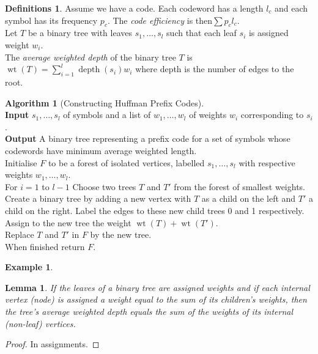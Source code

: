\documentclass{article}
\newtheorem*{lem}{Lemma}
\theoremstyle{definition}
\newtheorem*{defns}{Definitions}
\newtheorem*{ex}{Example}
\newtheorem*{alg}{Algorithm}
\DeclareMathOperator{\wt}{wt}
\DeclareMathOperator{\depth}{depth}
\begin{document}

\begin{defns}
Assume we have a code.
Each codeword has a length $l_c$ and each symbol has its frequency $p_c$.
The \emph{code efficiency} is then$\sum p_cl_c$. \\
Let $T$ be a binary tree with leaves $s_1,\ldots,s_l$ such that each leaf $s_i$ is assigned weight $w_i$.\\
The \emph{average weighted depth} of the binary tree $T$ is $\wt(T) = \sum_{i=1}^l\depth(s_i)w_i$ where depth is the number of edges to the root.
\end{defns}

\begin{alg}[Constructing Huffman Prefix Codes]~\\
\textbf{Input} $s_1,\ldots,s_l$ of symbols and a list of $w_1,\ldots,w_l$ of weights $w_i$ corresponding to $s_i$.\\
\textbf{Output} A binary tree representing a prefix code for a set of symbols whose codewords have minimum average weighted length.\\
Initialise $F$ to be a forest of isolated vertices, labelled $s_1,\ldots,s_l$ with respective weights $w_1,\ldots, w_l$. \\
For $i=1$ to $l-1$ Choose two trees $T$ and $T'$ from the forest of smallest weights.\\
Create a binary tree by adding a new vertex with $T$ as a child on the left and $T'$ a child on the right. Label the edges to these new child trees 0 and 1 respectively. \\
Assign to the new tree the weight $\wt(T)+\wt(T')$. \\
Replace $T$ and $T'$ in $F$ by the new tree. \\
When finished return $F$.
\end{alg}

\begin{ex}
\end{ex}

\begin{lem}
If the leaves of a binary tree are assigned weights and if each internal vertex (node) is assigned a weight equal to the sum of its children's weights, then the tree's average weighted depth equals the sum of the weights of its internal (non-leaf) vertices.
\end{lem}

\begin{proof}
In assignments.
\end{proof}
\end{document}
